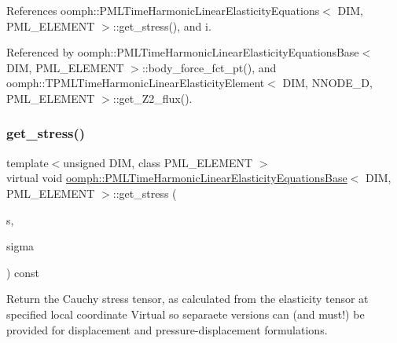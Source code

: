 References oomph\+::\+P\+M\+L\+Time\+Harmonic\+Linear\+Elasticity\+Equations$<$ D\+I\+M, P\+M\+L\+\_\+\+E\+L\+E\+M\+E\+N\+T $>$\+::get\+\_\+stress(), and i.



Referenced by oomph\+::\+P\+M\+L\+Time\+Harmonic\+Linear\+Elasticity\+Equations\+Base$<$ D\+I\+M, P\+M\+L\+\_\+\+E\+L\+E\+M\+E\+N\+T $>$\+::body\+\_\+force\+\_\+fct\+\_\+pt(), and oomph\+::\+T\+P\+M\+L\+Time\+Harmonic\+Linear\+Elasticity\+Element$<$ D\+I\+M, N\+N\+O\+D\+E\+\_\+D, P\+M\+L\+\_\+\+E\+L\+E\+M\+E\+N\+T $>$\+::get\+\_\+\+Z2\+\_\+flux().

\mbox{\label{classoomph_1_1PMLTimeHarmonicLinearElasticityEquationsBase_aed04505f397800718225e3d6c1bbee80}} 
\subsubsection{\texorpdfstring{get\+\_\+stress()}{get\_stress()}}
{\footnotesize\ttfamily template$<$unsigned D\+IM, class P\+M\+L\+\_\+\+E\+L\+E\+M\+E\+NT $>$ \\
virtual void \hyperlink{classoomph_1_1PMLTimeHarmonicLinearElasticityEquationsBase}{oomph\+::\+P\+M\+L\+Time\+Harmonic\+Linear\+Elasticity\+Equations\+Base}$<$ D\+IM, P\+M\+L\+\_\+\+E\+L\+E\+M\+E\+NT $>$\+::get\+\_\+stress (\begin{DoxyParamCaption}\item[{const \hyperlink{classoomph_1_1Vector}{Vector}$<$ double $>$ \&}]{s,  }\item[{\hyperlink{classoomph_1_1DenseMatrix}{Dense\+Matrix}$<$ std\+::complex$<$ double $>$ $>$ \&}]{sigma }\end{DoxyParamCaption}) const\hspace{0.3cm}{\ttfamily [pure virtual]}}



Return the Cauchy stress tensor, as calculated from the elasticity tensor at specified local coordinate Virtual so separaete versions can (and must!) be provided for displacement and pressure-\/displacement formulations. 



